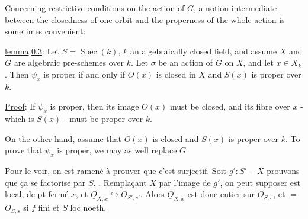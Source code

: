 Concerning restrictive conditions on the action of $G$, a notion intermediate between the closedness of one orbit and the properness of the whole action is sometimes convenient:

\uline{lemma} \uline{0.3}: Let $S=\operatorname{Spec}(k)$, $k$ an algebraically closed field, and assume $X$ and $G$ are algebraic pre-schemes over $k$. Let $\sigma$ be an action of $G$ on $X$, and let $x\in X_k$. Then $\psi_x$ is proper if and only if $O(x)$ is closed in $X$ and $S(x)$ is proper over $k$.

\uline{Proof}: If $\psi_x$ is proper, then its image $O(x)$ must be closed, and its fibre over $x$ - which is $S(x)$ - must be proper over $k$.

On the other hand, assume that $O(x)$ is closed and $S(x)$ is proper over $k$. To prove that $\psi_x$ is proper, we may as well replace $G$

Pour le voir,   on est ramené à prouver que c'est surjectif. Soit $g':S'\mathbin{-}X$ prouvons que ça se factorise par $S$.
. Remplaçant $X$ par l'image  de $g'$, on peut supposer
 est  local, de pt fermé $x$, et $\underline O_{X,x}\hookrightarrow O_{S',s'}$. Alors $\underline O_{X,x}$ est donc entier sur $O_{S,s}$, et $=$  $O_{S,s}$ si $f$ fini et $S$ loc noeth.

